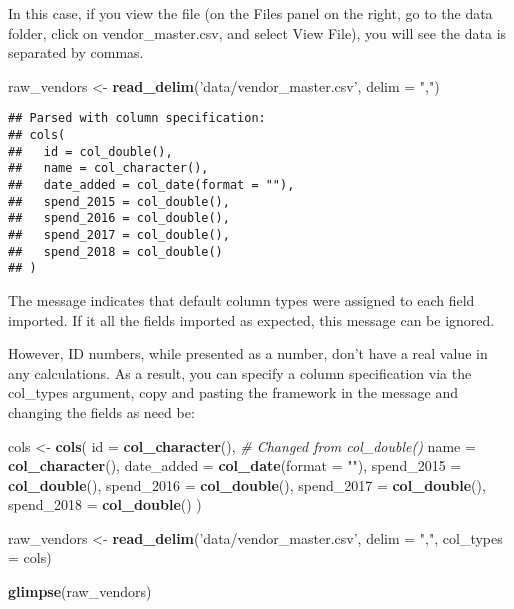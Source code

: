 \documentclass[
]{book}
\newenvironment{Shaded}{\begin{snugshade}}{\end{snugshade}}
\newcommand{\CommentTok}[1]{\textcolor[rgb]{0.56,0.35,0.01}{\textit{#1}}}
\newcommand{\DataTypeTok}[1]{\textcolor[rgb]{0.13,0.29,0.53}{#1}}
\newcommand{\KeywordTok}[1]{\textcolor[rgb]{0.13,0.29,0.53}{\textbf{#1}}}
\newcommand{\NormalTok}[1]{#1}
\newcommand{\StringTok}[1]{\textcolor[rgb]{0.31,0.60,0.02}{#1}}
\begin{document}
In this case, if you view the file (on the Files panel on the right, go to the data folder, click on vendor\_master.csv, and select View File), you will see the data is separated by commas.

\begin{Shaded}
\begin{Highlighting}[]
\NormalTok{raw_vendors <-}\StringTok{ }\KeywordTok{read_delim}\NormalTok{(}\StringTok{'data/vendor_master.csv'}\NormalTok{, }\DataTypeTok{delim =} \StringTok{","}\NormalTok{)}
\end{Highlighting}
\end{Shaded}

\begin{verbatim}
## Parsed with column specification:
## cols(
##   id = col_double(),
##   name = col_character(),
##   date_added = col_date(format = ""),
##   spend_2015 = col_double(),
##   spend_2016 = col_double(),
##   spend_2017 = col_double(),
##   spend_2018 = col_double()
## )
\end{verbatim}

The message indicates that default column types were assigned to each field imported. If it all the fields imported as expected, this message can be ignored.

However, ID numbers, while presented as a number, don't have a real value in any calculations. As a result, you can specify a column specification via the col\_types argument, copy and pasting the framework in the message and changing the fields as need be:

\begin{Shaded}
\begin{Highlighting}[]
\NormalTok{cols <-}\StringTok{ }\KeywordTok{cols}\NormalTok{(}
  \DataTypeTok{id =} \KeywordTok{col_character}\NormalTok{(), }\CommentTok{# Changed from col_double()}
  \DataTypeTok{name =} \KeywordTok{col_character}\NormalTok{(),}
  \DataTypeTok{date_added =} \KeywordTok{col_date}\NormalTok{(}\DataTypeTok{format =} \StringTok{""}\NormalTok{),}
  \DataTypeTok{spend_2015 =} \KeywordTok{col_double}\NormalTok{(),}
  \DataTypeTok{spend_2016 =} \KeywordTok{col_double}\NormalTok{(),}
  \DataTypeTok{spend_2017 =} \KeywordTok{col_double}\NormalTok{(),}
  \DataTypeTok{spend_2018 =} \KeywordTok{col_double}\NormalTok{()}
\NormalTok{)}

\NormalTok{raw_vendors <-}\StringTok{ }\KeywordTok{read_delim}\NormalTok{(}\StringTok{'data/vendor_master.csv'}\NormalTok{, }\DataTypeTok{delim =} \StringTok{","}\NormalTok{, }\DataTypeTok{col_types =}\NormalTok{ cols)}

\KeywordTok{glimpse}\NormalTok{(raw_vendors)}
\end{Highlighting}
\end{Shaded}
\end{document}
